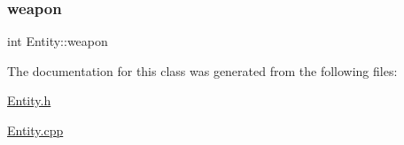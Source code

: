 \mbox{\label{class_entity_aa4361bec43383b3fdfe53f53e71c93a6}} 
\subsubsection{\texorpdfstring{weapon}{weapon}}
{\footnotesize\ttfamily int Entity\+::weapon\hspace{0.3cm}{\ttfamily [private]}}



The documentation for this class was generated from the following files\+:\begin{DoxyCompactItemize}
\item 
\hyperlink{_entity_8h}{Entity.\+h}\item 
\hyperlink{_entity_8cpp}{Entity.\+cpp}\end{DoxyCompactItemize}
